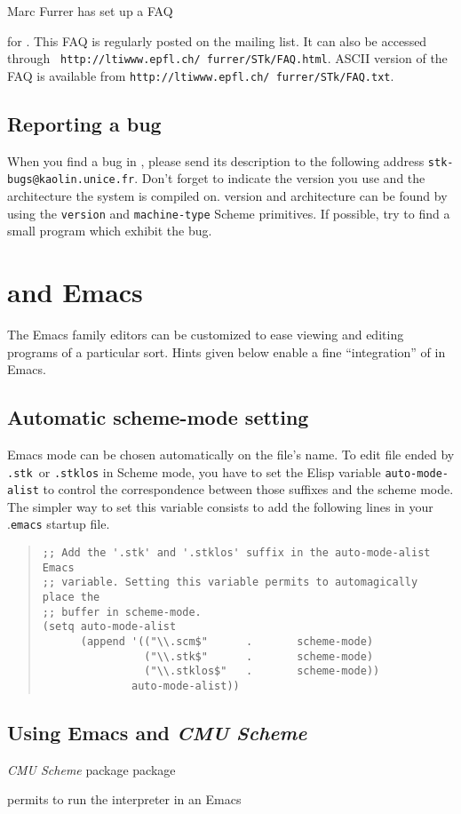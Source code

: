 Marc Furrer has set up a FAQ{ for {\stk}. 
This FAQ is regularly posted on the {\stk} mailing list. It can
also be accessed through  {\tt
http://ltiwww.epfl.ch/~furrer/STk/FAQ.html}. ASCII version of the FAQ is
available from {\tt http://ltiwww.epfl.ch/~furrer/STk/FAQ.txt}.

\subsection{Reporting a bug}

When you find a bug in {\stk}, please send its description to the following
address {\tt stk-bugs@kaolin.unice.fr}. Don't forget to indicate the version
you use and the architecture the system is compiled on.  {\stk} version and
architecture can be found by using the {\tt version} and {\tt machine-type}
Scheme primitives. If possible, try to find a small program which exhibit the bug.

\section{{\stk} and Emacs}

The Emacs family editors can be customized to ease
viewing and editing programs of a particular sort. Hints given below
enable a fine ``integration'' of {\stk} in Emacs.

\subsection*{Automatic scheme-mode setting}

Emacs mode can be chosen automatically on the file's name. To edit file
ended by {\tt .stk }or {\tt .stklos} in Scheme mode, you have to set the
Elisp variable {\tt auto-mode-alist} to control the correspondence between
those suffixes and the scheme mode. The simpler way to set this variable
consists to add the following lines in your .{\tt emacs} startup file.


\begin{quote}
\begin{verbatim}
;; Add the '.stk' and '.stklos' suffix in the auto-mode-alist Emacs
;; variable. Setting this variable permits to automagically place the
;; buffer in scheme-mode.
(setq auto-mode-alist
      (append '(("\\.scm$"      .       scheme-mode)
                ("\\.stk$"      .       scheme-mode)
                ("\\.stklos$"   .       scheme-mode))
              auto-mode-alist))
\end{verbatim}
\end{quote}

\subsection*{Using Emacs and {\em CMU Scheme}}

{\em CMU Scheme} package package} permits to run the {\stk} interpreter in an Emacs
